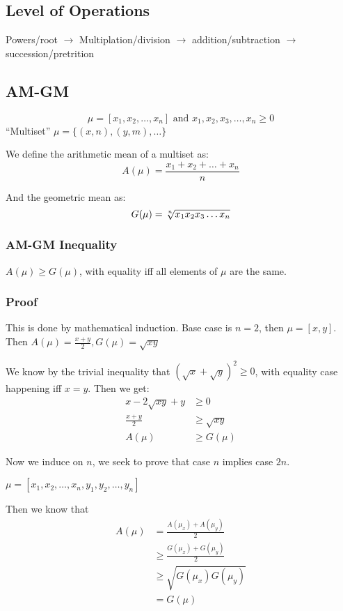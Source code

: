 \documentclass[11 pt, twoside]{article}
\begin{document}
\subsection{Level of Operations}
Powers/root $\to$ Multiplation/division $\to$ addition/subtraction $\to$
succession/pretrition
\subsection{AM-GM}

$$\mu = [x_1, x_2, \dots, x_n] \text{ and } x_1, x_2, x_3, \dots, x_n \geq 0$$
``Multiset'' $\mu = \{(x, n), (y, m), \dots\}$

We define the arithmetic mean of a multiset as:
$$A(\mu) = \frac{x_1 + x_2 + \dots + x_n}{n}$$

And the geometric mean as:
$$G(\mu) = \sqrt[\uproot{2}n]{x_1x_2x_3\dots x_n}$$

\subsubsection{AM-GM Inequality}
$A(\mu) \geq G(\mu)$, with equality iff all elements
of $\mu$ are the same.

\subsubsection{Proof}
This is done by mathematical induction. Base case is $n = 2$, then $\mu = [x,
y]$. Then $A(\mu) = \frac{x + y}{2}, G(\mu) = \sqrt{xy}$

We know by the trivial inequality that $(\sqrt{x} + \sqrt{y})^2 \geq 0$, with
equality case happening iff $x = y$. Then we get:
\begin{align*}
x - 2 \sqrt{xy} + y &\geq 0\\
\frac{x + y}{2} &\geq \sqrt{xy}\\
A(\mu) &\geq G(\mu)
\end{align*}

Now we induce on $n$, we seek to prove that case $n$ implies case $2n$.

$\mu = [x_1, x_2, \dots, x_n, y_1, y_2, \dots, y_n]$

Then we know that
\begin{align*}
A(\mu) &= \frac{A(\mu_x) + A(\mu_y)}{2}\\
&\geq \frac{G(\mu_x) + G(\mu_y)}{2}\\
&\geq \sqrt{G(\mu_x)G(\mu_y)}\\
&= G(\mu)
\end{align*}
\end{document}
